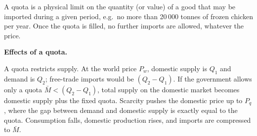 \documentclass[11pt]{article}
\newcommand{\cle}[1]{{\popxbold\color{popdark}#1}}
\newcounter{popsec}
\newcounter{popsub}
\newcommand{\courssub}[1]{%
  \stepcounter{popsub}%
  \par\vspace{9pt}\noindent{\popxbold\fontsize{11.5}{13}\selectfont\color{popink}{\color{poporange}\thepopsec.\thepopsub}\hspace{6pt}#1}\par\nopagebreak\vspace{4pt}
}
\begin{document}
\courssub{Quotas}

\begin{definition}[Quota]
A \cle{quota} is a physical limit on the quantity (or value) of a good that may be imported during a given period, e.g.\ no more than 20\,000 tonnes of frozen chicken per year. Once the quota is filled, no further imports are allowed, whatever the price.
\end{definition}

\textbf{Effects of a quota.}\par
A quota restricts supply. At the world price $P_w$, domestic supply is $Q_1$ and demand is $Q_2$; free-trade imports would be $(Q_2 - Q_1)$. If the government allows only a quota $\bar{M} < (Q_2 - Q_1)$, total supply on the domestic market becomes domestic supply plus the fixed quota. Scarcity pushes the domestic price up to $P_q$, where the gap between demand and domestic supply is exactly equal to the quota. Consumption falls, domestic production rises, and imports are compressed to $\bar{M}$.
\end{document}
